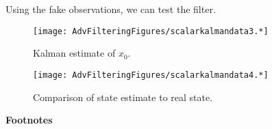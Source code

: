 Using the fake observations, we can test the filter.

\begin{Shaded}
\begin{Highlighting}[]
\OperatorTok{=}
\OperatorTok{=}

\OperatorTok{=} \OperatorTok{:}
\OperatorTok{=}\NormalTok{ x\_filtered[k}\OperatorTok{{-}}\NormalTok{] }\OperatorTok{+} \OperatorTok{*}\OperatorTok{{-}}\OperatorTok{*}\OperatorTok{/}
\OperatorTok{=}\NormalTok{ covariance\_filtered[k}\OperatorTok{{-}}\NormalTok{] }\OperatorTok{+}\OperatorTok{*}
\OperatorTok{=}\OperatorTok{/}\OperatorTok{+}\OperatorTok{*}
\OperatorTok{=}\OperatorTok{+}\OperatorTok{*}\NormalTok{(z\_sim[k}\OperatorTok{{-}}\NormalTok{] }\OperatorTok{{-}}
\OperatorTok{=}\NormalTok{ (}\OperatorTok{{-}}\OperatorTok{*}

\OperatorTok{=}\OperatorTok{,}
\end{Highlighting}
\end{Shaded}

\begin{figure}
\centering
\texttt{[image: AdvFilteringFigures/scalarkalmandata3.*]}
\caption{Kalman estimate of \(x_0\).}
\end{figure}

\begin{figure}
\centering
\texttt{[image: AdvFilteringFigures/scalarkalmandata4.*]}
\caption{Comparison of state estimate to real state.}
\end{figure}

\textbf{Footnotes}
